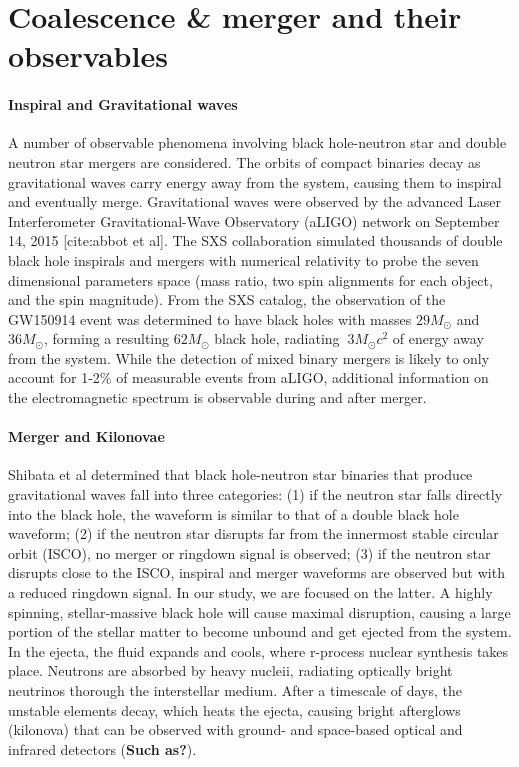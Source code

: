 \section{Coalescence \& merger and their observables}
\label{sec:observables}

\paragraph{Inspiral and Gravitational waves}
A number of observable phenomena involving black hole-neutron star and double neutron star mergers are considered.  
The orbits of compact binaries decay as gravitational waves carry energy away from the system, causing them to inspiral and eventually merge.  Gravitational waves were observed by the advanced Laser Interferometer Gravitational-Wave Observatory (aLIGO) network on September 14, 2015 [cite:abbot et al]. 
The SXS collaboration simulated thousands of double black hole inspirals and mergers with numerical relativity to probe the seven dimensional parameters space (mass ratio, two spin alignments for each object, and the spin magnitude).  From the SXS catalog, the observation of the GW150914 event was determined to have black holes with masses $29 M_\odot$ and $36 M_\odot$, forming a resulting $62 M_\odot$ black hole, radiating $~3 M_\odot c^2$ of energy away from the system.
While the detection of mixed binary mergers is likely to only account for 1-2\% of measurable events from aLIGO, additional information on the electromagnetic spectrum is observable during and after merger. 

\paragraph{Merger and Kilonovae}
Shibata et al determined that black hole-neutron star binaries that produce gravitational waves fall into three categories: (1) if the neutron star falls directly into the black hole, the waveform is similar to that of a double black hole waveform; (2) if the neutron star disrupts far from the innermost stable circular orbit (ISCO), no merger or ringdown signal is observed; (3) if the neutron star disrupts close to the ISCO, inspiral and merger waveforms are observed but with a reduced ringdown signal.
In our study, we are focused on the latter. 
A highly spinning, stellar-massive black hole will cause maximal disruption, causing a large portion of the stellar matter to become unbound and get ejected from the system.
In the ejecta, the fluid expands and cools, where r-process nuclear synthesis takes place.  Neutrons are absorbed by heavy nucleii, radiating optically bright neutrinos thorough the interstellar medium. 
After a timescale of days, the unstable elements decay, which heats the ejecta, causing bright afterglows (kilonova) that can be observed with ground- and space-based optical and infrared detectors (\textbf{Such as?}).

